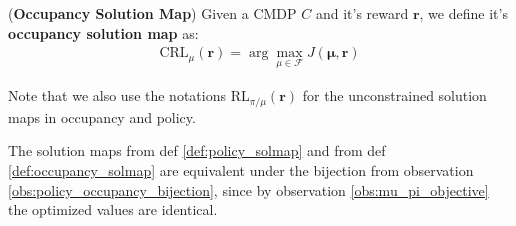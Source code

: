 \begin{definition}
    \label{def:occupancy_solmap}
    (\textbf{Occupancy Solution Map})
    Given a CMDP $\textit{C}$ and it's reward $\bm{r}$, we define it's \textbf{occupancy solution map} as:
    \begin{align*}
        \text{CRL}_{\mu}(\bm{r}) = \arg \max_{\mu\in \mathcal{F}}  J(\bm{\mu},\bm{r})
    \end{align*}
\end{definition}

Note that we also use the notations $\text{RL}_{\pi/\mu} (\bm{r})$ for the unconstrained solution maps in occupancy and policy.

\begin{observation}
    The solution maps from def \ref{def:policy_solmap} and from def \ref{def:occupancy_solmap}  are equivalent under the bijection from observation \ref{obs:policy_occupancy_bijection}, since by observation \ref{obs:mu_pi_objective} the optimized values are identical.
\end{observation}